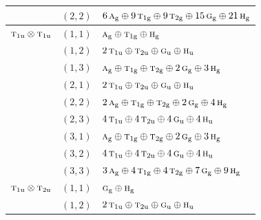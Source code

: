 \documentclass[11pt]{article}
\newcommand{\irr}[1]{\text{\normalfont\scshape #1}}
\newcommand{\ptag}[1]{\mathrm{#1}}
\begin{document}
\begin{longtable}{p{} c p{}}
 & $(2,2)$ & $6\,\irr{a}_{\ptag{g}}\oplus 9\,\irr{t}_{1\ptag{g}}\oplus 9\,\irr{t}_{2\ptag{g}}\oplus 15\,\irr{g}_{\ptag{g}}\oplus 21\,\irr{h}_{\ptag{g}}$\\

\hline

$\irr{t}_{1\ptag{u}}\otimes \irr{t}_{1\ptag{u}}$ & $(1,1)$ & $\irr{a}_{\ptag{g}}\oplus \irr{t}_{1\ptag{g}}\oplus \irr{h}_{\ptag{g}}$\\

 & $(1,2)$ & $2\,\irr{t}_{1\ptag{u}}\oplus \irr{t}_{2\ptag{u}}\oplus \irr{g}_{\ptag{u}}\oplus \irr{h}_{\ptag{u}}$\\

 & $(1,3)$ & $\irr{a}_{\ptag{g}}\oplus \irr{t}_{1\ptag{g}}\oplus \irr{t}_{2\ptag{g}}\oplus 2\,\irr{g}_{\ptag{g}}\oplus 3\,\irr{h}_{\ptag{g}}$\\

 & $(2,1)$ & $2\,\irr{t}_{1\ptag{u}}\oplus \irr{t}_{2\ptag{u}}\oplus \irr{g}_{\ptag{u}}\oplus \irr{h}_{\ptag{u}}$\\

 & $(2,2)$ & $2\,\irr{a}_{\ptag{g}}\oplus \irr{t}_{1\ptag{g}}\oplus \irr{t}_{2\ptag{g}}\oplus 2\,\irr{g}_{\ptag{g}}\oplus 4\,\irr{h}_{\ptag{g}}$\\

 & $(2,3)$ & $4\,\irr{t}_{1\ptag{u}}\oplus 4\,\irr{t}_{2\ptag{u}}\oplus 4\,\irr{g}_{\ptag{u}}\oplus 4\,\irr{h}_{\ptag{u}}$\\

 & $(3,1)$ & $\irr{a}_{\ptag{g}}\oplus \irr{t}_{1\ptag{g}}\oplus \irr{t}_{2\ptag{g}}\oplus 2\,\irr{g}_{\ptag{g}}\oplus 3\,\irr{h}_{\ptag{g}}$\\

 & $(3,2)$ & $4\,\irr{t}_{1\ptag{u}}\oplus 4\,\irr{t}_{2\ptag{u}}\oplus 4\,\irr{g}_{\ptag{u}}\oplus 4\,\irr{h}_{\ptag{u}}$\\

 & $(3,3)$ & $3\,\irr{a}_{\ptag{g}}\oplus 4\,\irr{t}_{1\ptag{g}}\oplus 4\,\irr{t}_{2\ptag{g}}\oplus 7\,\irr{g}_{\ptag{g}}\oplus 9\,\irr{h}_{\ptag{g}}$\\

\hline

$\irr{t}_{1\ptag{u}}\otimes \irr{t}_{2\ptag{u}}$ & $(1,1)$ & $\irr{g}_{\ptag{g}}\oplus \irr{h}_{\ptag{g}}$\\

 & $(1,2)$ & $2\,\irr{t}_{1\ptag{u}}\oplus \irr{t}_{2\ptag{u}}\oplus \irr{g}_{\ptag{u}}\oplus \irr{h}_{\ptag{u}}$\\


\end{longtable}
\end{document}
